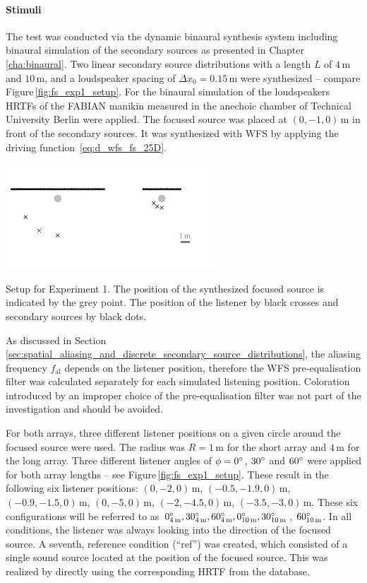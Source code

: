 \paragraph{Stimuli}
The test was conducted via the dynamic binaural synthesis system including
binaural simulation of the secondary sources as presented in
Chapter\,\ref{cha:binaural}.
Two linear secondary source distributions with a length $L$ of $4$\,m
and $10$\,m, and a loudspeaker spacing of
$\Delta x_0 = 0.15$\,m were synthesized -- compare Figure\,\ref{fig:fs_exp1_setup}.
For the binaural simulation of the loudspeakers \acp{HRTF} of the {\small FABIAN}
manikin measured in the anechoic chamber of Technical
University Berlin were applied.
The focused source was placed at $(0,-1,0)$\,m in front of the secondary
sources. It was synthesized with \twohalfD \ac{WFS} by applying the driving
function~\ref{eq:d_wfs_fs_25D}.
%
\begin{marginfigure}
    \includegraphics{fig5_13/fig5_13}
    \caption{Setup for Experiment 1. The position of the synthesized focused
    source is indicated by the grey point. The position of the listener by black
    crosses and secondary sources by black dots.
        }
    \label{fig:fs_exp1_setup}
\end{marginfigure}
%

As discussed in
Section\,\ref{sec:spatial_aliasing_and_discrete_secondary_source_distributions},
the aliasing frequency
$f_\text{al}$ depends on the listener position, therefore the WFS
pre-equalisation filter was
calculated separately for each simulated listening position.
Coloration introduced by an improper choice of the
pre-equalisation filter was not part of the investigation
and should be avoided.

For both arrays, three different listener positions on a given circle around the
focused source were used. The radius was $R = 1$\,m for the short array and
$4$\,m for the long array.  Three different listener angles of $\phi =
0^\circ$, $30^\circ$ and $60^\circ$ were applied for both array lengths -- see
Figure\,\ref{fig:fs_exp1_setup}. These result in the following six listener
positions: $(0,-2,0)$\,m, $(-0.5,-1.9,0)$\,m, $(-0.9,-1.5,0)$\,m, $(0,-5,0)$\,m,
$(-2,-4.5,0)$\,m, $(-3.5,-3,0)$\,m.
These six configurations will be referred to as $0^\circ_{4\,\text{m}},
30^\circ_{4\,\text{m}}, 60^\circ_{4\,\text{m}}, 0^\circ_{10\,\text{m}},
30^\circ_{10\,\text{m}}$, $60^\circ_{10\,\text{m}}$.  In all conditions, the
listener was always looking into the direction of the focused source.  A seventh,
reference condition (``ref'') was created, which consisted of a
single sound source located at the position of the focused source.
This was realized by directly using the corresponding \ac{HRTF} from the database.

